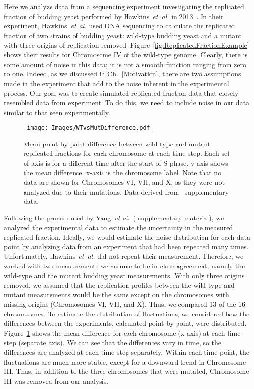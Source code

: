 		Here we analyze data from a sequencing experiment investigating the replicated fraction of budding yeast performed by Hawkins~\emph{et~al.} in 2013~\cite{StochasticTermination}.
		In their experiment, Hawkins~\emph{et~al.} used DNA sequencing to calculate the replicated fraction of two strains of budding yeast: wild-type budding yeast and a mutant with three origins of replication removed.
		Figure~\ref{fig:ReplicatedFractionExample} shows their results for Chromosome IV of the wild-type genome.
		Clearly, there is some amount of noise in this data; it is not a smooth function ranging from zero to one.
		Indeed, as we discussed in Ch.~\ref{Motivation}, there are two assumptions made in the experiment that add to the noise inherent in the experimental process.
		Our goal was to create simulated replicated fraction data that closely resembled data from experiment.
		To do this, we need to include noise in our data similar to that seen experimentally.
		
		\begin{figure}[tbh!]
			\begin{center}
				\texttt{[image: Images/WTvsMutDifference.pdf]}
			\end{center}
				\caption[Estimating Experimental Noise A]{\label{fig:MeanDifference} Mean point-by-point difference between wild-type and mutant replicated fractions for each chromosome at each time-step.
					Each set of axis is for a different time after the start of S phase.
					y-axis shows the mean difference.
					x-axis is the chromosome label.
					Note that no data are shown for Chromosomes VI, VII, and X, as they were not analyzed due to their mutations.
					Data derived from~\cite{StochasticTermination} supplementary data.
				}
		\end{figure}
		
		Following the process used by Yang~\emph{et al.}~(\cite{ScottsPaper} supplementary material), we analyzed the experimental data to estimate the uncertainty in the measured replicated fraction.
		Ideally, we would estimate the noise distribution for each data point by analyzing data from an experiment that had been repeated many times.
		Unfortunately, Hawkins~\emph{et~al.} did not repeat their measurement.
		Therefore, we worked with two measurements we assume to be in close agreement, namely the wild-type and the mutant budding yeast measurements.
		With only three origins removed, we assumed that the replication profiles between the wild-type and mutant measurements would be the same except on the chromosomes with missing origins (Chromosomes VI, VII, and X).
		Thus, we compared 13 of the 16 chromosomes.
		To estimate the distribution of fluctuations, we considered how the differences between the experiments, calculated point-by-point, were distributed.
		Figure~\ref{fig:MeanDifference} shows the mean difference for each chromosome (x-axis) at each time-step (separate axis).
		We can see that the differences vary in time, so the differences are analyzed at each time-step separately.
		Within each time-point, the fluctuations are much more stable, except for a downward trend in Chromosome III.
		Thus, in addition to the three chromosomes that were mutated, Chromosome III was removed from our analysis.
		
